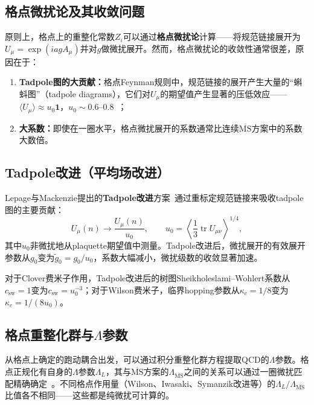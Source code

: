 \documentclass[12pt,a4paper]{ctexart}
\theoremstyle{definition}
\begin{document}
\subsection{格点微扰论及其收敛问题}

原则上，格点上的重整化常数$Z_i$可以通过\textbf{格点微扰论}计算——将规范链接展开为$U_\mu = \exp(iagA_\mu)$并对$g$做微扰展开。然而，格点微扰论的收敛性通常很差，原因在于：

\begin{enumerate}[leftmargin=*]
    \item \textbf{Tadpole图的大贡献：}格点Feynman规则中，规范链接的展开产生大量的``蝌蚪图''（tadpole diagrams），它们对$U_\mu$的期望值产生显著的压低效应——$\langle U_\mu \rangle \approx u_0 \mathbf{1}$，$u_0 \sim 0.6\text{--}0.8$~\cite{Gupta1997intro,LepageMackenzie1993}；
    \item \textbf{大系数：}即使在一圈水平，格点微扰展开的系数通常比连续$\overline{\text{MS}}$方案中的系数大数倍。
\end{enumerate}

\subsection{Tadpole改进（平均场改进）}

Lepage与Mackenzie提出的\textbf{Tadpole改进}方案~\cite{LepageMackenzie1993,Gupta1997intro}通过重标定规范链接来吸收tadpole图的主要贡献：
\begin{equation}
U_\mu(n) \to \frac{U_\mu(n)}{u_0}, \qquad u_0 = \left\langle \frac{1}{3}\operatorname{tr} U_{\mu\nu} \right\rangle^{1/4},
\label{eq:tadpole_improvement}
\end{equation}
其中$u_0$非微扰地从plaquette期望值中测量。Tadpole改进后，微扰展开的有效展开参数从$g_0$变为$\tilde g_0 = g_0/u_0$，系数大幅减小，微扰级数的收敛显著加速。

对于Clover费米子作用，Tadpole改进后的树图Sheikholeslami--Wohlert系数从$c_{\text{sw}}=1$变为$c_{\text{sw}} = u_0^{-3}$；对于Wilson费米子，临界hopping参数从$\kappa_c = 1/8$变为$\kappa_c = 1/(8u_0)$。

\subsection{格点重整化群与$\Lambda$参数}

从格点上确定的跑动耦合出发，可以通过积分重整化群方程提取QCD的$\Lambda$参数。格点正规化有自身的$\Lambda$参数$\Lambda_L$，其与$\overline{\text{MS}}$方案的$\Lambda_{\overline{\text{MS}}}$之间的关系可以通过一圈微扰匹配精确确定~\cite{GattringerLang2010}。不同格点作用量（Wilson、Iwasaki、Symanzik改进等）的$\Lambda_L/\Lambda_{\overline{\text{MS}}}$比值各不相同——这些都是纯微扰可计算的。
\end{document}
